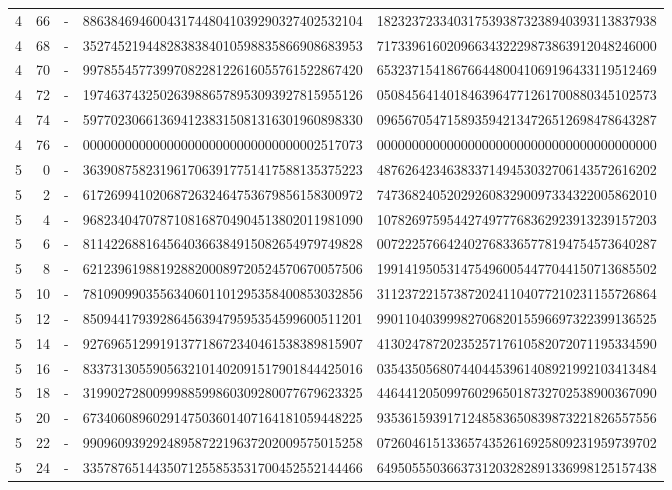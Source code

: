 \begin{longtable}{rrrll}
4 & 66 & - & 8863846946004317448041039290327402532104 & 1823237233403175393873238940393113837938 \\
4 & 68 & - & 3527452194482838384010598835866908683953 & 7173396160209663432229873863912048246000 \\
4 & 70 & - & 9978554577399708228122616055761522867420 & 6532371541867664480041069196433119512469 \\
4 & 72 & - & 1974637432502639886578953093927815955126 & 0508456414018463964771261700880345102573 \\
4 & 74 & - & 5977023066136941238315081316301960898330 & 0965670547158935942134726512698478643287 \\
4 & 76 & - & 0000000000000000000000000000000002517073 & 0000000000000000000000000000000000000000 \\
5 & 0 & - & 3639087582319617063917751417588135375223 & 4876264234638337149453032706143572616202 \\
5 & 2 & - & 6172699410206872632464753679856158300972 & 7473682405202926083290097334322005862010 \\
5 & 4 & - & 9682340470787108168704904513802011981090 & 1078269759544274977768362923913239157203 \\
5 & 6 & - & 8114226881645640366384915082654979749828 & 0072225766424027683365778194754573640287 \\
5 & 8 & - & 6212396198819288200089720524570670057506 & 1991419505314754960054477044150713685502 \\
5 & 10 & - & 7810909903556340601101295358400853032856 & 3112372215738720241104077210231155726864 \\
5 & 12 & - & 8509441793928645639479595354599600511201 & 9901104039998270682015596697322399136525 \\
5 & 14 & - & 9276965129919137718672340461538389815907 & 4130247872023525717610582072071195334590 \\
5 & 16 & - & 8337313055905632101402091517901844425016 & 0354350568074404453961408921992103413484 \\
5 & 18 & - & 3199027280099988599860309280077679623325 & 4464412050997602965018732702538900367090 \\
5 & 20 & - & 6734060896029147503601407164181059448225 & 9353615939171248583650839873221826557556 \\
5 & 22 & - & 9909609392924895872219637202009575015258 & 0726046151336574352616925809231959739702 \\
5 & 24 & - & 3357876514435071255853531700452552144466 & 6495055503663731203282891336998125157438 \\

\end{longtable}
